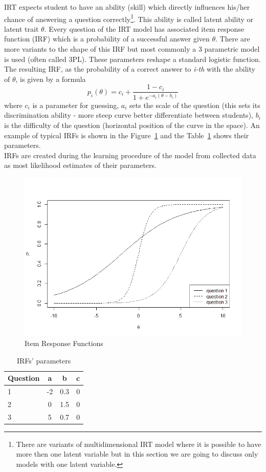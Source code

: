 IRT expects student to have an ability (skill) which directly influences his/her chance of answering a question correctly\footnote{There are variants of multidimensional IRT model where it is possible to have more then one latent variable but in this section we are going to discuss only models with one latent variable.}. This ability is called latent ability or latent trait $\theta$. Every question of the IRT model has associated item response function (IRF) which is a probability of a successful answer given $\theta$. There are more variants to the shape of this IRF but most commonly a 3 parametric model is used (often called 3PL). These parameters reshape a standard logistic function. The resulting IRF, as the probability of a correct answer to \textit{i-th} with the ability of $\theta$, is given by a formula
\begin{equation}
p_i(\theta) = c_i + \frac{1-c_i}{1+e^{-a_i(\theta-b_i)}}
\label{eq:IRF}
\end{equation}
where $c_i$ is a parameter for guessing, $a_i$ sets the scale of the question (this sets its discrimination ability - more steep curve better differentiate between students), $b_i$ is the difficulty of the question (horizontal position of the curve in the space). An example of typical IRFs is shown in the Figure~\ref{pic:IRFs} and the Table~\ref{tab:IRFs} shows their parameters.\\
IRFs are created during the learning procedure of the model from collected data as most likelihood estimates of their parameters.

\begin{figure}
  \includegraphics[width=0.8\columnwidth]{obr/irfs.png}%
  \caption{Item Response Functions}%
	\label{pic:IRFs}%
\end{figure}
\begin{table}%
	\begin{tabular}{lccc} \hline
		Question & a & b & c \\ \hline
		1 & -2 & 0.3 & 0\\
		2 & 0 & 1.5 & 0\\
		3 & 5 & 0.7 & 0\\
	\hline
  \end{tabular}
  \caption{IRFs' parameters}%
	\label{tab:IRFs}%
\end{table}
  


